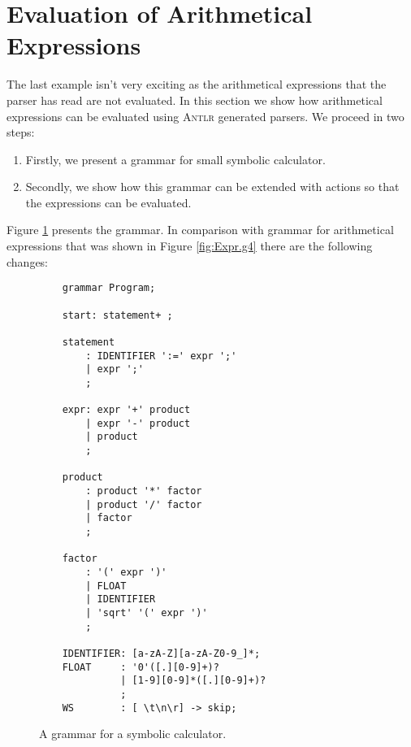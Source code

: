 \section{Evaluation of Arithmetical Expressions}
The last example isn't very exciting as the arithmetical expressions that the parser has read are not
evaluated.  In this section we show how arithmetical expressions can be evaluated using \textsc{Antlr}
generated parsers.  We proceed in two steps:
\begin{enumerate}
\item Firstly, we present a grammar for small symbolic calculator.
\item Secondly, we show how this grammar can be extended with actions so that the expressions can be evaluated.
\end{enumerate}
Figure \ref{fig:Program.g4} presents the grammar.  In comparison with grammar for arithmetical expressions that
was shown in Figure \ref{fig:Expr.g4} there are the following changes:

\begin{figure}[!ht]
\centering
\begin{verbatim}
    grammar Program;
    
    start: statement+ ; 
    
    statement
        : IDENTIFIER ':=' expr ';' 
        | expr ';'                 
        ;
    
    expr: expr '+' product 
        | expr '-' product 
        | product
        ;
    
    product 
        : product '*' factor 
        | product '/' factor 
        | factor
        ;
    
    factor
        : '(' expr ')'        
        | FLOAT               
        | IDENTIFIER          
        | 'sqrt' '(' expr ')'
        ;
    
    IDENTIFIER: [a-zA-Z][a-zA-Z0-9_]*;
    FLOAT     : '0'([.][0-9]+)?
              | [1-9][0-9]*([.][0-9]+)?
              ;
    WS        : [ \t\n\r] -> skip; 
\end{verbatim}
\vspace*{-0.3cm}
\caption{A grammar for a symbolic calculator.}
\label{fig:Program.g4}
\end{figure}


